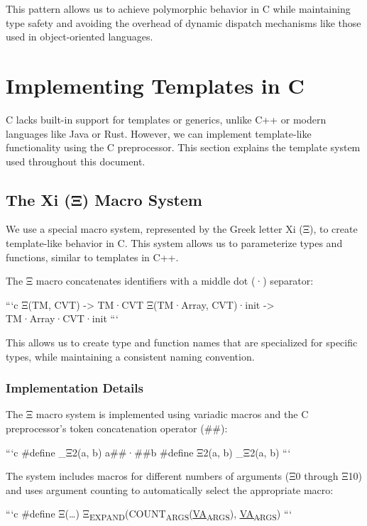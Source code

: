 \documentclass[11pt]{article}
\begin{document}
This pattern allows us to achieve polymorphic behavior in C while maintaining type safety and avoiding the overhead of dynamic dispatch mechanisms like those used in object-oriented languages.

\section{Implementing Templates in C}
\label{sec:orge82e21e}

C lacks built-in support for templates or generics, unlike C++ or modern languages like Java or Rust. However, we can implement template-like functionality using the C preprocessor. This section explains the template system used throughout this document.

\subsection{The Xi (Ξ) Macro System}
\label{sec:org1ff0935}

We use a special macro system, represented by the Greek letter Xi (Ξ), to create template-like behavior in C. This system allows us to parameterize types and functions, similar to templates in C++.

The Ξ macro concatenates identifiers with a middle dot (·) separator:

```c
Ξ(TM, CVT)              -> TM·CVT
Ξ(TM·Array, CVT)·init   -> TM·Array·CVT·init
```

This allows us to create type and function names that are specialized for specific types, while maintaining a consistent naming convention.

\subsubsection{Implementation Details}
\label{sec:org08d9fe2}

The Ξ macro system is implemented using variadic macros and the C preprocessor's token concatenation operator (\#\#):

```c
\#define \_Ξ2(a, b) a\#\#·\#\#b
\#define Ξ2(a, b) \_Ξ2(a, b)
```

The system includes macros for different numbers of arguments (Ξ0 through Ξ10) and uses argument counting to automatically select the appropriate macro:

```c
\#define Ξ(\ldots{}) Ξ\textsubscript{EXPAND}(COUNT\textsubscript{ARGS}(\uline{\uline{VA\textsubscript{ARGS}}}), \uline{\uline{VA\textsubscript{ARGS}}})
```
\end{document}
